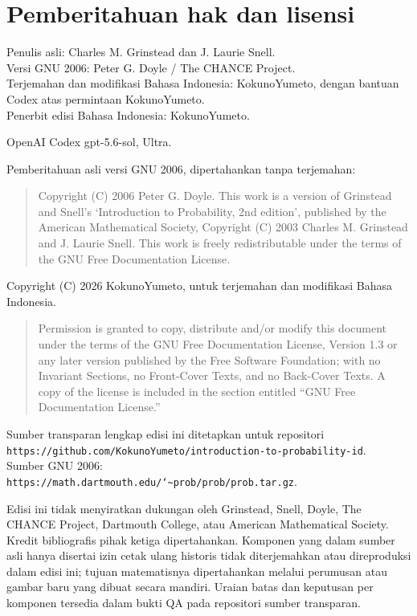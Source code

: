 \clearpage
\thispagestyle{empty}
\chapter*{Pemberitahuan hak dan lisensi}

\noindent
Penulis asli: Charles M. Grinstead dan J. Laurie Snell.\\
Versi GNU 2006: Peter G. Doyle / The CHANCE Project.\\
Terjemahan dan modifikasi Bahasa Indonesia: KokunoYumeto, dengan bantuan
Codex atas permintaan KokunoYumeto.\\
Penerbit edisi Bahasa Indonesia: KokunoYumeto.

\medskip
\noindent
OpenAI Codex gpt-5.6-sol, Ultra.

\bigskip
\noindent
Pemberitahuan asli versi GNU 2006, dipertahankan tanpa terjemahan:

\begin{quote}
Copyright (C) 2006 Peter G. Doyle.  This work is a version of Grinstead and
Snell's `Introduction to Probability, 2nd edition', published by the American
Mathematical Society, Copyright (C) 2003 Charles M. Grinstead and J. Laurie
Snell.  This work is freely redistributable under the terms of the GNU Free
Documentation License.
\end{quote}

\noindent
Copyright (C) 2026 KokunoYumeto, untuk terjemahan dan modifikasi Bahasa
Indonesia.

\begin{quote}
Permission is granted to copy, distribute and/or modify this document under
the terms of the GNU Free Documentation License, Version 1.3 or any later
version published by the Free Software Foundation; with no Invariant
Sections, no Front-Cover Texts, and no Back-Cover Texts.  A copy of the
license is included in the section entitled ``GNU Free Documentation
License.''
\end{quote}

\noindent
Sumber transparan lengkap edisi ini ditetapkan untuk repositori\\
\texttt{https://github.com/KokunoYumeto/introduction-to-probability-id}.\\
Sumber GNU 2006: \\
\texttt{https://math.dartmouth.edu/{\char`\~}prob/prob/prob.tar.gz}.

\medskip
\noindent
Edisi ini tidak menyiratkan dukungan oleh Grinstead, Snell, Doyle, The CHANCE
Project, Dartmouth College, atau American Mathematical Society. Kredit
bibliografis pihak ketiga dipertahankan. Komponen yang dalam sumber asli hanya
disertai izin cetak ulang historis tidak diterjemahkan atau direproduksi dalam
edisi ini; tujuan matematisnya dipertahankan melalui perumusan atau gambar baru
yang dibuat secara mandiri. Uraian batas dan keputusan per komponen tersedia
dalam bukti QA pada repositori sumber transparan.
